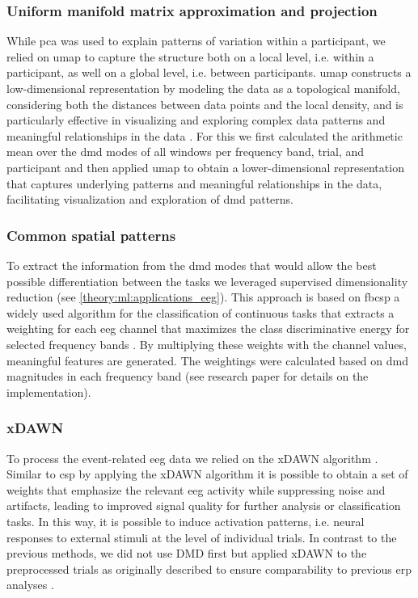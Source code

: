 \subsubsection{Uniform manifold matrix approximation and projection}
While \gls{pca} was used to explain patterns of variation within a participant, we relied on \gls{umap} to capture the structure both on a local level, i.e. within a participant, as well on a global level, i.e. between participants. \Gls{umap} constructs a low-dimensional representation by modeling the data as a topological manifold, considering both the distances between data points and the local density, and is particularly effective in visualizing and exploring complex data patterns and meaningful relationships in the data \cite{mcinnes2018umap}. For this we first calculated the arithmetic mean over the \gls{dmd} modes of all windows per frequency band, trial, and participant and then applied \gls{umap} to obtain a lower-dimensional representation that captures underlying patterns and meaningful relationships in the data, facilitating visualization and exploration of \gls{dmd} patterns.

\subsubsection{Common spatial patterns}
To extract the information from the \gls{dmd} modes that would allow the best possible differentiation between the tasks we leveraged supervised dimensionality reduction (see \autoref{theory:ml:applications_eeg}). This approach is based on \gls{fbcsp} a widely used algorithm for the classification of continuous tasks that extracts a weighting for each \gls{eeg} channel that maximizes the class discriminative energy for selected frequency bands \cite{ang2012filter}. By multiplying these weights with the channel values, meaningful features are generated. The weightings were calculated based on \gls{dmd} magnitudes in each frequency band (see research paper  \cite{Goelz2021a} for details on the implementation).\\

\subsubsection{xDAWN}
To process the event-related \gls{eeg} data we relied on the xDAWN algorithm \cite{rivet2009xdawn}. Similar to \gls{csp} by applying the xDAWN algorithm it is possible to obtain a set of weights that emphasize the relevant \gls{eeg} activity while suppressing noise and artifacts, leading to improved signal quality for further analysis or classification tasks. In this way, it is possible to induce activation patterns, i.e. neural responses to external stimuli at the level of individual trials. In contrast to the previous methods, we did not use DMD first but applied xDAWN to the preprocessed trials as originally described to ensure comparability to previous \gls{erp} analyses \cite{Reuter2019}.\\


